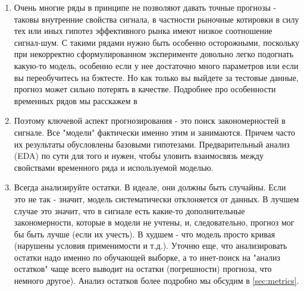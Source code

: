 \begin{enumerate}
  \item Очень многие ряды в принципе не позволяют давать точные
    прогнозы - таковы внутренние свойства сигнала, в частности
    рыночные котировки в силу тех или иных гипотез эффективного
    рынка имеют низкое соотношение сигнал-шум. С такими рядами
    нужно быть особенно осторожными, поскольку при некорректно
    сформулированном эксперименте довольно легко подогнать
    какую-то модель, особенно если у нее достаточно много
    параметров или если вы переобучитесь на
    бэктесте. Но как только вы выйдете за тестовые данные, прогноз
    может сильно потерять в качестве. Подробнее про особенности
    временных рядов мы расскажем в
  \item Поэтому ключевой аспект прогнозирования - это поиск
    закономерностей в сигнале. Все "модели" фактически именно этим
    и занимаются. Причем часто их
    результаты обусловлены базовыми гипотезами. Предварительный
    анализ (EDA) по сути для того и нужен, чтобы уловить
    взаимосвязь между свойствами временного ряда и используемой моделью.

  \item Всегда анализируйте остатки. В идеале, они должны быть
    случайны. Если это не так - значит, модель
    систематически отклоняется от данных. В лучшем случае это значит, что
    в сигнале есть какие-то дополнительные закономерности, которые в
    модели не учтены, и, следовательно, прогноз мог бы быть лучше (если
    их учесть). В худшем - что модель просто кривая (нарушены условия
    применимости и т.д.). Уточню еще, что анализировать остатки надо
    именно по обучающей выборке, а то инет-поиск на "анализ остатков"
  чаще всего выводит на остатки (погрешности) прогноза, что немного другое).
  Анализ остатков более подробно мы обсудим в \autoref{sec:metrics}.
\end{enumerate}

\printbibliography[heading=subbibliography, title={Источники}]
